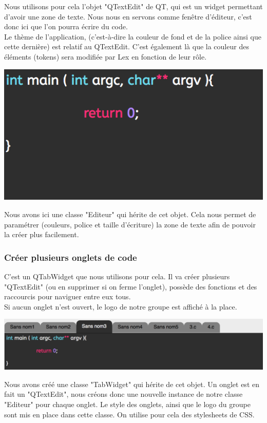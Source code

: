 \documentclass[a4paper,12pt]{article}
\begin{document}
			 	Nous utilisons pour cela l'objet "QTextEdit" de QT, qui est un widget permettant d'avoir une zone de texte. Nous nous en servons comme fenêtre d'éditeur, c'est donc ici que l'on pourra écrire du code.\\
			Le thème de l'application, (c'est-à-dire la couleur de fond et de la police ainsi que cette dernière) est relatif au QTextEdit. C'est également là que la couleur des éléments (tokens) sera modifiée par Lex en fonction de leur rôle.\\
			\begin{center}
				\includegraphics[scale=0.8]{images/QTextEdit}
				\vspace{0.5cm}
			\end{center}
			Nous avons ici une classe "Editeur" qui hérite de cet objet. Cela nous permet de paramétrer (couleurs, police et taille d'écriture) la zone de texte afin de pouvoir la créer plus facilement.\\
			
			\subsubsection*{Créer plusieurs onglets de code}
			
			 	C'est un QTabWidget que nous utilisons pour cela. Il va créer plusieurs "QTextEdit" (ou en supprimer si on ferme l'onglet), possède des fonctions et des raccourcis pour naviguer entre eux tous. \\
			Si aucun onglet n'est ouvert, le logo de notre groupe est affiché à la place.\\
			\begin{center}
				\includegraphics[scale=0.6]{images/QTabWidget}
				\vspace{0.5cm}
			\end{center}
			Nous avons créé une classe "TabWidget" qui hérite de cet objet. Un onglet est en fait un "QTextEdit", nous créons donc une nouvelle instance de notre classe "Editeur" pour chaque onglet. Le style des onglets, ainsi que le logo du groupe sont mis en place dans cette classe. On utilise pour cela des stylesheets de CSS.\\
			
\end{document}
